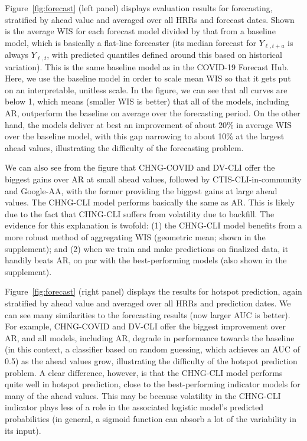 \documentclass[9pt,twocolumn,twoside,lineno]{pnas-new}
\begin{document}
Figure~\ref{fig:forecast} (left panel) displays evaluation results for
forecasting, stratified by ahead value and averaged over all HRRs and forecast
dates.  Shown is the average WIS for each forecast model divided by that from a
baseline model, which is basically a flat-line forecaster (its median forecast
for $Y_{\ell,t+a}$ is always $Y_{\ell,t}$, with predicted quantiles defined
around this based on historical variation). This is the same baseline model as
in the COVID-19 Forecast Hub. Here, we use the baseline model in order to scale
mean WIS so that it gets put on an interpretable, unitless scale.  In the
figure, we can see that all curves are below 1, which means (smaller WIS is
better) that all of the models, including AR, outperform the baseline on average
over the forecasting period.  On the other hand, the models deliver at best an
improvement of about 20\% in average WIS over the baseline model, with this gap
narrowing to about 10\% at the largest ahead values, illustrating the difficulty 
of the forecasting problem.

We can also see from the figure that CHNG-COVID and DV-CLI offer the biggest
gains over AR at small ahead values, followed by CTIS-CLI-in-community and
Google-AA, with the former providing the biggest gains at large ahead values.
The CHNG-CLI model performs basically the same as AR.  This is likely due to the
fact that CHNG-CLI suffers from volatility due to backfill.  The evidence for
this explanation is twofold: (1) the CHNG-CLI model benefits from a more robust
method of aggregating WIS (geometric mean; shown in the supplement); and (2)
when we train and make predictions on finalized data, it handily beats AR, on
par with the best-performing models (also shown in the supplement).  

Figure~\ref{fig:forecast} (right panel) displays the results for hotspot
prediction, again stratified by ahead value and averaged over all HRRs and
prediction dates.  We can see many similarities to the forecasting results (now
larger AUC is better). For example, CHNG-COVID and DV-CLI offer the biggest
improvement over AR, and all models, including AR, degrade in performance
towards the baseline (in this context, a classifier based on random guessing,
which achieves an AUC of 0.5) as the ahead values grow, illustrating the
difficulty of the hotspot prediction problem. A clear difference, however, is
that the CHNG-CLI model performs quite well in hotspot prediction, close to the
best-performing indicator models for many of the ahead values. This may be
because volatility in the CHNG-CLI indicator plays less of a role in the
associated logistic model's predicted probabilities (in general, a sigmoid
function can absorb a lot of the variability in its input).
\end{document}
